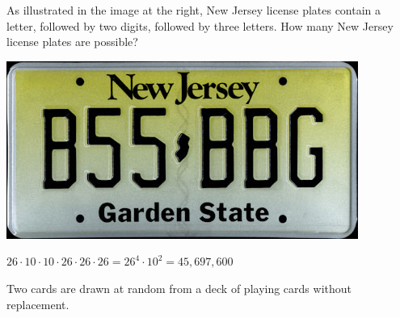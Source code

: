 \documentclass[answers,addpoints,12pt]{exam}
\begin{document}
\begin{questions}

\begin{multicols}{2}
\question[10]
As illustrated in the image at the right,
New Jersey license plates contain a letter,
followed by two digits, followed by three letters.
How many New Jersey license plates are possible?\\
\columnbreak
\begin{center}\includegraphics[scale=.3]{NewJersy}
\end{center}
\end{multicols}
\begin{solution}{\vfill}
$26\cdot 10\cdot 10\cdot 26\cdot 26\cdot 26=26^4\cdot 10^2
=45,697,600$
\end{solution}
\newpage

\question[16] Two cards are drawn at random from a deck of playing cards
without replacement.


\end{questions}
\end{document}
